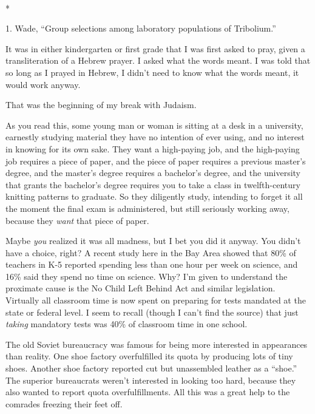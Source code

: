 {\centering
 \ ~
\par}

{\centering
 *
\par}


\bigskip

{
 1. Wade, ``Group selections among laboratory
populations of Tribolium.''}


{
 It was in either kindergarten or first grade that I was first
asked to pray, given a transliteration of a Hebrew prayer. I asked what
the words meant. I was told that so long as I prayed in Hebrew, I
didn't need to know what the words meant, it would work
anyway. }

{
 That was the beginning of my break with Judaism.}

{
 As you read this, some young man or woman is sitting at a desk in
a university, earnestly studying material they have no intention of
ever using, and no interest in knowing for its own sake. They want a
high-paying job, and the high-paying job requires a piece of paper, and
the piece of paper requires a previous master's degree,
and the master's degree requires a
bachelor's degree, and the university that grants the
bachelor's degree requires you to take a class in
twelfth-century knitting patterns to graduate. So they diligently
study, intending to forget it all the moment the final exam is
administered, but still seriously working away, because they
\textit{want} that piece of paper.}

{
 Maybe \textit{you} realized it was all madness, but I bet you did
it anyway. You didn't have a choice, right? A recent
study here in the Bay Area showed that 80\% of teachers in K-5 reported
spending less than one hour per week on science, and 16\% said they
spend no time on science. Why? I'm given to understand
the proximate cause is the No Child Left Behind Act and similar
legislation. Virtually all classroom time is now spent on preparing for
tests mandated at the state or federal level. I seem to recall (though
I can't find the source) that just \textit{taking}
mandatory tests was 40\% of classroom time in one school.}

{
 The old Soviet bureaucracy was famous for being more interested in
appearances than reality. One shoe factory overfulfilled its quota by
producing lots of tiny shoes. Another shoe factory reported cut but
unassembled leather as a ``shoe.''
The superior bureaucrats weren't interested in looking
too hard, because they also wanted to report quota overfulfillments.
All this was a great help to the comrades freezing their feet off.}

